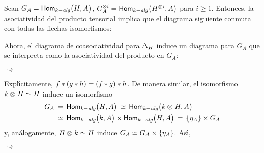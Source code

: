 Sean $G_A=\Homalg\big(H,A\big)$,
$G_A^{\otimes i}=\Homalg\big(H^{\otimes i},A\big)$ para $i\geq 1$. Entonces, la
asociatividad del producto tensorial implica que el diagrama siguiente
conmuta con todas las flechas isomorfismos:
\begin{center}
\end{center}
Ahora, el diagrama de coasociatividad para $\coproducto[H]$ induce un diagrama
para $G_A$ que se interpreta como la asociatividad del producto en $G_A$:
\begin{center}
	$\rightsquigarrow$
\end{center}
Expl\'{\i}citamente, $f\convol (g\convol h)=(f\convol g)\convol h$. De manera
similar, el isomorfismo $k\tensor H\simeq H$ induce un isomorfismo
\begin{align*}
	G_A & \,=\,\Homalg\big(H,A\big)
		\,\simeq\,\Homalg\big(k\tensor H,A\big) \\
	& \,\simeq\,\Homalg\big(k,A\big)\times\Homalg\big(H,A\big)
		\,=\,\{\unidad[A]\}\times G_A
\end{align*}
%
y, an\'{a}logamente, $H\tensor k\simeq H$ induce
$G_A\simeq G_A\times \{\unidad[A]\}$. As\'{\i},
\begin{center}
	$\rightsquigarrow$
\end{center}
